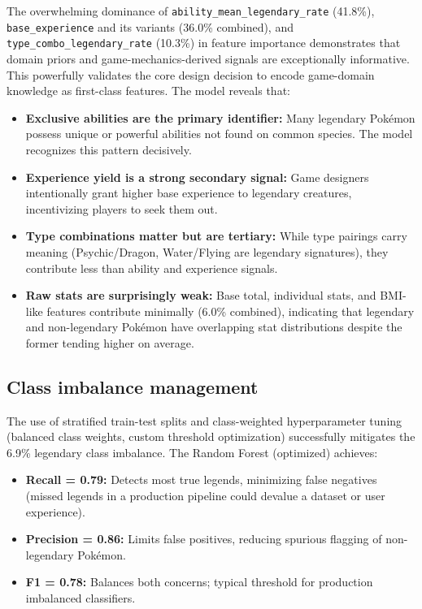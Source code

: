 The overwhelming dominance of \texttt{ability\_mean\_legendary\_rate} (41.8\%), \texttt{base\_experience} and its variants (36.0\% combined), and \texttt{type\_combo\_legendary\_rate} (10.3\%) in feature importance demonstrates that domain priors and game-mechanics-derived signals are exceptionally informative. This powerfully validates the core design decision to encode game-domain knowledge as first-class features. The model reveals that:
\begin{itemize}
  \item \textbf{Exclusive abilities are the primary identifier:} Many legendary Pokémon possess unique or powerful abilities not found on common species. The model recognizes this pattern decisively.
  \item \textbf{Experience yield is a strong secondary signal:} Game designers intentionally grant higher base experience to legendary creatures, incentivizing players to seek them out.
  \item \textbf{Type combinations matter but are tertiary:} While type pairings carry meaning (Psychic/Dragon, Water/Flying are legendary signatures), they contribute less than ability and experience signals.
  \item \textbf{Raw stats are surprisingly weak:} Base total, individual stats, and BMI-like features contribute minimally (6.0\% combined), indicating that legendary and non-legendary Pokémon have overlapping stat distributions despite the former tending higher on average.
\end{itemize}

\subsection{Class imbalance management}

The use of stratified train-test splits and class-weighted hyperparameter tuning (balanced class weights, custom threshold optimization) successfully mitigates the 6.9\% legendary class imbalance. The Random Forest (optimized) achieves:
\begin{itemize}
  \item \textbf{Recall = 0.79:} Detects most true legends, minimizing false negatives (missed legends in a production pipeline could devalue a dataset or user experience).
  \item \textbf{Precision = 0.86:} Limits false positives, reducing spurious flagging of non-legendary Pokémon.
  \item \textbf{F1 = 0.78:} Balances both concerns; typical threshold for production imbalanced classifiers.
\end{itemize}

